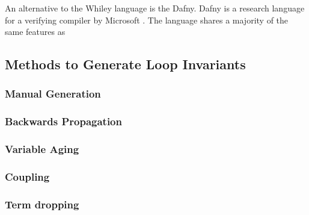 An alternative to the Whiley language is the Dafny.
Dafny is a research language for a verifying compiler by Microsoft
\cite{dafny-lang}.
The language shares a majority of the same features as

\cite{dafny-started}
\cite{dafny-lang}
\cite{dafny-mech}

\subsection{Methods to Generate Loop Invariants}

\subsubsection{Manual Generation}

\cite{broda-loop-tech}

\subsubsection{Backwards Propagation}

\cite{infer-postconditions}
\cite{infer-dynamic}

\subsubsection{Variable Aging}

\cite{infer-postconditions}
\cite{infer-dynamic}

\subsubsection{Coupling}

\cite{infer-postconditions}
\cite{infer-dynamic}

\subsubsection{Term dropping}

\cite{infer-postconditions}
\cite{infer-dynamic}

\cite{struct-induction}
